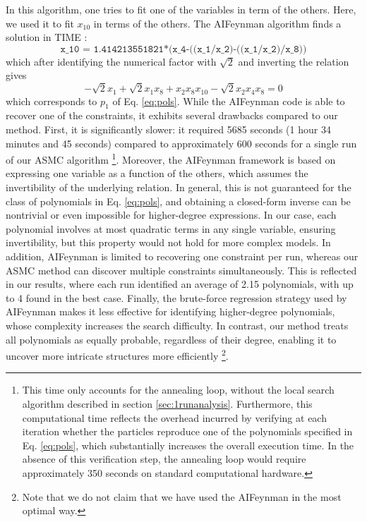 \documentclass[11pt,a4paper]{article}
\begin{document}
In this algorithm, one tries to fit one of the variables in term of the others. Here, we used it to fit $x_{10}$ in terms of the others. The AIFeynman algorithm finds a solution in TIME : 
\begin{equation}
	\texttt{x\_10 = 1.414213551821*(x\_4-((x\_1/x\_2)-((x\_1/x\_2)/x\_8))}
\end{equation}
which after identifying the numerical factor with $\sqrt 2$ and inverting the relation gives 
\begin{equation}
	- \sqrt 2 x_1 + \sqrt 2 x_1 x_8 + x_2 x_8  x_{10} -\sqrt 2 x_2 x_4 x_8 = 0
\end{equation}
which corresponds to $p_1$ of Eq. \eqref{eq:pols}. While the AIFeynman code is able to recover one of the constraints, it exhibits several drawbacks compared to our method. First, it is significantly slower: it required 5685 seconds (1 hour 34 minutes and 45 seconds) compared to approximately 600 seconds for a single run of our ASMC algorithm \footnote{This time only accounts for the annealing loop, without the local search algorithm described in section \ref{sec:1runanalysis}. Furthermore, this computational time reflects the overhead incurred by verifying at each iteration whether the particles reproduce one of the polynomials specified in Eq. \eqref{eq:pols}, which substantially increases the overall execution time. In the absence of this verification step, the annealing loop would require approximately 350 seconds on standard computational hardware.}. Moreover, the AIFeynman framework is based on expressing one variable as a function of the others, which assumes the invertibility of the underlying relation. In general, this is not guaranteed for the class of polynomials in Eq. \eqref{eq:pols}, and obtaining a closed-form inverse can be nontrivial or even impossible for higher-degree expressions. In our case, each polynomial involves at most quadratic terms in any single variable, ensuring invertibility, but this property would not hold for more complex models. In addition, AIFeynman is limited to recovering one constraint per run, whereas our ASMC method can discover multiple constraints simultaneously. This is reflected in our results, where each run identified an average of 2.15 polynomials, with up to 4 found in the best case. Finally, the brute-force regression strategy used by AIFeynman makes it less effective for identifying higher-degree polynomials, whose complexity increases the search difficulty. In contrast, our method treats all polynomials as equally probable, regardless of their degree, enabling it to uncover more intricate structures more efficiently \footnote{Note that we do not claim that we have used the AIFeynman in the most optimal way.}.
\end{document}
